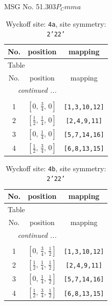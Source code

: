 \documentclass[fleqn,8pt]{jsarticle}
\begin{document}
\setcounter{MaxMatrixCols}{32}

\renewcommand{\tablename}{Table~}
\renewcommand{\figurename}{Figure~}
\begin{center}
\LARGE
MSG No. 51.303\quad$P_{C}mma$
\end{center}
\renewcommand{\arraystretch}{1.2}
\begin{longtable}{ccc}
\caption{Wyckoff site: {\tt 4a}, site symmetry: {\tt 2'22'}}
 \\
 \hline \hline
No. & position & mapping \\ \hline \endfirsthead

\multicolumn{2}{l}{\tablename\ \thetable{}} \\
 \hline \hline
No. & position & mapping \\ \hline \endhead

 \hline \hline
\multicolumn{2}{r}{\footnotesize\it continued ...} \\ \endfoot

 \hline \hline
\multicolumn{2}{r}{} \\ \endlastfoot

1 & $\left[ 0,\, \frac{3}{4},\, 0 \right]$ & {\tt [1,3,10,12]} \\ \hline
2 & $\left[ \frac{1}{2},\, \frac{1}{4},\, 0 \right]$ & {\tt [2,4,9,11]} \\ \hline
3 & $\left[ 0,\, \frac{1}{4},\, 0 \right]$ & {\tt [5,7,14,16]} \\ \hline
4 & $\left[ \frac{1}{2},\, \frac{3}{4},\, 0 \right]$ & {\tt [6,8,13,15]} \\
\end{longtable}
\renewcommand{\arraystretch}{1.2}
\begin{longtable}{ccc}
\caption{Wyckoff site: {\tt 4b}, site symmetry: {\tt 2'22'}}
 \\
 \hline \hline
No. & position & mapping \\ \hline \endfirsthead

\multicolumn{2}{l}{\tablename\ \thetable{}} \\
 \hline \hline
No. & position & mapping \\ \hline \endhead

 \hline \hline
\multicolumn{2}{r}{\footnotesize\it continued ...} \\ \endfoot

 \hline \hline
\multicolumn{2}{r}{} \\ \endlastfoot

1 & $\left[ 0,\, \frac{3}{4},\, \frac{1}{2} \right]$ & {\tt [1,3,10,12]} \\ \hline
2 & $\left[ \frac{1}{2},\, \frac{1}{4},\, \frac{1}{2} \right]$ & {\tt [2,4,9,11]} \\ \hline
3 & $\left[ 0,\, \frac{1}{4},\, \frac{1}{2} \right]$ & {\tt [5,7,14,16]} \\ \hline
4 & $\left[ \frac{1}{2},\, \frac{3}{4},\, \frac{1}{2} \right]$ & {\tt [6,8,13,15]} \\
\end{longtable}
\end{document}
